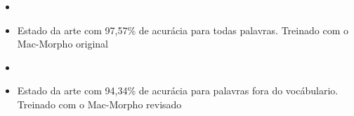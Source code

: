 \documentclass[10pt]{beamer}
\begin{document}
\begin{frame}[fragile]
  \begin{itemize}

  \item[\ ] \ 

  \item Estado da arte com 97,57\% de acurácia para todas palavras. Treinado com o Mac-Morpho original \cite{fonseca2015evaluating}

  \item[\ ] \ 

  \item Estado da arte com 94,34\% de acurácia para palavras fora do vocábulario. Treinado com o Mac-Morpho revisado \cite{fonseca2015evaluating}
  
  \end{itemize}

\end{frame}
\end{document}
